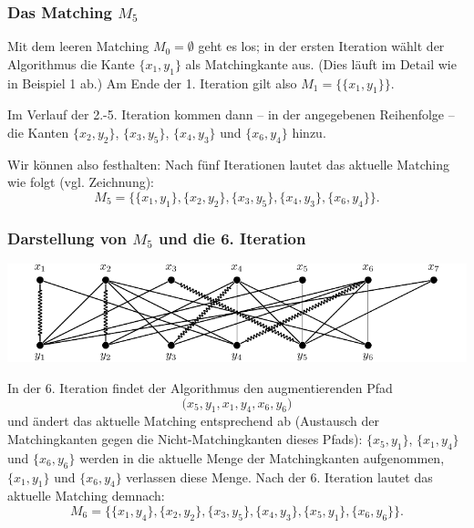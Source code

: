 \documentclass[smaller]{beamer}
\begin{document}
\begin{frame}
\frametitle{Das Matching $M_5$}
 Mit dem \alert{leeren Matching $M_0 = \emptyset$} geht es los; in der ersten Iteration wählt der Algorithmus die Kante $\big\{ x_1,y_1 \big\}$ als Matchingkante aus. (Dies läuft im Detail wie in Beispiel 1 ab.) Am Ende der 1. Iteration gilt also $M_1 = \big\{ \{x_1,y_1\} \big\}$. \\ \vspace*{0.2cm}
 
 Im Verlauf der 2.-5. Iteration kommen dann -- in der angegebenen Reihenfolge -- die Kanten $\big\{ x_2,y_2 \big\}$, $\big\{ x_3,y_5 \big\}$, $\big\{ x_4,y_3 \big\}$ und $\big\{ x_6,y_4 \big\}$ hinzu.
 
 \alert{Wir können also festhalten:} Nach fünf Iterationen lautet das aktuelle Matching wie folgt (vgl. Zeichnung):
\[
M_5 = \Big\{ 
\big\{ x_1,y_1 \big\}, 
\big\{ x_2,y_2 \big\}, 
\big\{ x_3,y_5 \big\}, 
\big\{ x_4,y_3 \big\},
\big\{ x_6,y_4 \big\}
\Big\}.
\]
\end{frame}

\begin{frame}
 \frametitle{Darstellung von $M_5$ und die 6. Iteration}
 \begin{center}
  \includegraphics[scale=0.8]{fig58.pdf}
 \end{center}
In der 6. Iteration findet der Algorithmus den augmentierenden Pfad
\[
\big( x_5, y_1, x_1, y_4, x_6, y_6 \big)
\]
und ändert das aktuelle Matching entsprechend ab \alert{(Austausch der Matchingkanten gegen die Nicht-Matchingkanten dieses Pfads):} $\big\{ x_5,y_1 \big\}$, $\big\{ x_1,y_4 \big\}$ und $\big\{ x_6,y_6 \big\}$ werden in die aktuelle Menge der Matchingkanten aufgenommen, $\big\{ x_1,y_1 \big\}$ und $\big\{ x_6,y_4 \big\}$ verlassen diese Menge. Nach der 6. Iteration lautet das aktuelle Matching demnach:
\[
M_6 = \Big\{ 
\big\{ x_1,y_4 \big\}, 
\big\{ x_2,y_2 \big\}, 
\big\{ x_3,y_5 \big\}, 
\big\{ x_4,y_3 \big\},
\big\{ x_5,y_1 \big\},
\big\{ x_6,y_6 \big\}
\Big\}.
\]
\end{frame}
\end{document}
